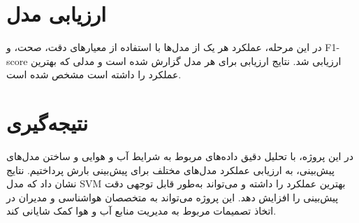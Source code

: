 \documentclass{article}
\begin{document}
	\section{ارزیابی مدل}
	در این مرحله، عملکرد هر یک از مدل‌ها با استفاده از معیارهای دقت، صحت، و F1-score ارزیابی شد. نتایج ارزیابی برای هر مدل گزارش شده است و مدلی که بهترین عملکرد را داشته است مشخص شده است.
	
	\section{نتیجه‌گیری}
	در این پروژه، با تحلیل دقیق داده‌های مربوط به شرایط آب و هوایی و ساختن مدل‌های پیش‌بینی، به ارزیابی عملکرد مدل‌های مختلف برای پیش‌بینی بارش پرداختیم. نتایج نشان داد که مدل SVM بهترین عملکرد را داشته و می‌تواند به‌طور قابل توجهی دقت پیش‌بینی را افزایش دهد. این پروژه می‌تواند به متخصصان هواشناسی و مدیران در اتخاذ تصمیمات مربوط به مدیریت منابع آب و هوا کمک شایانی کند.
	
\end{document}
